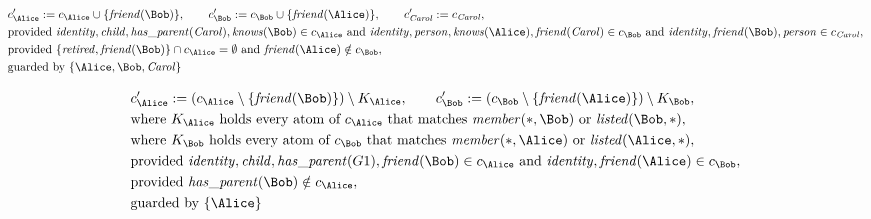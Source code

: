 \begin{align*}
&
c'_
{
\Alice
}
 := 
c_
{
\Alice
}
 \cup 
\{
\mathit{\detokenize{
friend
}}
(
\Bob
)
\}
, \qquad 
c'_
{
\Bob
}
 := 
c_
{
\Bob
}
 \cup 
\{
\mathit{\detokenize{
friend
}}
(
\Alice
)
\}
, \qquad 
c'_
{
\mathit{Carol}
}
 := 
c_
{
\mathit{Carol}
}
,\\
&
\text{provided } 
\mathit{\detokenize{
identity
}}
,
\mathit{\detokenize{
child
}}
,
\mathit{\detokenize{
has_parent
}}
(
\mathit{Carol}
)
,
\mathit{\detokenize{
knows
}}
(
\Bob
)
 \in c_
{
\Alice
}
 \text{ and } 
\mathit{\detokenize{
identity
}}
,
\mathit{\detokenize{
person
}}
,
\mathit{\detokenize{
knows
}}
(
\Alice
)
,
\mathit{\detokenize{
friend
}}
(
\mathit{Carol}
)
 \in c_
{
\Bob
}
 \text{ and } 
\mathit{\detokenize{
identity
}}
,
\mathit{\detokenize{
friend
}}
(
\Bob
)
,
\mathit{\detokenize{
person
}}
 \in c_
{
\mathit{Carol}
}
,\\
&
\text{provided } 
\{
\mathit{\detokenize{
retired
}}
,
\mathit{\detokenize{
friend
}}
(
\Bob
)
\}
 \cap c_
{
\Alice
}
 = \emptyset
 \text{ and } 
\mathit{\detokenize{
friend
}}
(
\Alice
)
 \notin c_
{
\Bob
}
,\\
&
\text{guarded by } \{
\Alice
,
\Bob
,
\mathit{Carol}
\}
\end{align*}

\begin{align*}
&
c'_
{
\Alice
}
 := 
(c_
{
\Alice
}
 \setminus 
\{
\mathit{\detokenize{
friend
}}
(
\Bob
)
\}
) \setminus K_
{
\Alice
}
, \qquad 
c'_
{
\Bob
}
 := 
(c_
{
\Bob
}
 \setminus 
\{
\mathit{\detokenize{
friend
}}
(
\Alice
)
\}
) \setminus K_
{
\Bob
}
,\\
&
\text{where } K_
{
\Alice
}
 \text{ holds every atom of } c_
{
\Alice
}
 \text{ that matches } 
\mathit{\detokenize{
member
}}
(
\ast
,
\Bob
)
 \text{ or } 
\mathit{\detokenize{
listed
}}
(
\Bob
,
\ast
)
,\\
&
\text{where } K_
{
\Bob
}
 \text{ holds every atom of } c_
{
\Bob
}
 \text{ that matches } 
\mathit{\detokenize{
member
}}
(
\ast
,
\Alice
)
 \text{ or } 
\mathit{\detokenize{
listed
}}
(
\Alice
,
\ast
)
,\\
&
\text{provided } 
\mathit{\detokenize{
identity
}}
,
\mathit{\detokenize{
child
}}
,
\mathit{\detokenize{
has_parent
}}
(
G1
)
,
\mathit{\detokenize{
friend
}}
(
\Bob
)
 \in c_
{
\Alice
}
 \text{ and } 
\mathit{\detokenize{
identity
}}
,
\mathit{\detokenize{
friend
}}
(
\Alice
)
 \in c_
{
\Bob
}
,\\
&
\text{provided } 
\mathit{\detokenize{
has_parent
}}
(
\Bob
)
 \notin c_
{
\Alice
}
,\\
&
\text{guarded by } \{
\Alice
\}
\end{align*}
